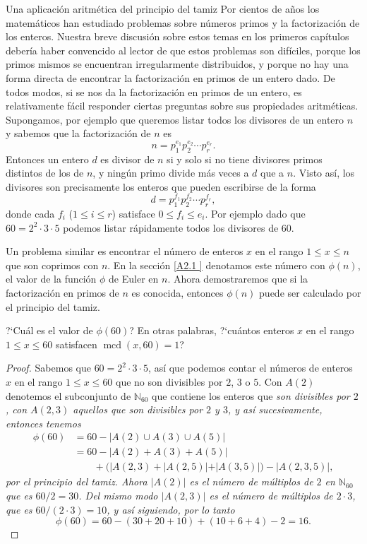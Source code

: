 \begin{section}{Una aplicación aritmética del principio del
tamiz}\label{Ap2.2} Por cientos de años los matemáticos han
estudiado problemas sobre números primos y la fac\-to\-ri\-za\-ción de los
enteros. Nuestra breve discusión sobre estos temas en los primeros
capítulos debería haber convencido al lector de que estos
problemas son difíciles, porque los primos mismos se encuentran
irregularmente distribuidos, y porque no hay una forma directa de
encontrar la factorización en primos de un entero dado. De todos
modos, si se nos da la factorización en primos de un entero, es
relativamente fácil responder ciertas preguntas sobre sus
propiedades aritméticas. Supongamos, por ejemplo que queremos
listar todos los divisores de un entero $n$ y sabemos que la
factorización de $n$ es
$$
n=p_1^{e_1}p_2^{e_2}\cdots p_r^{e_r}.
$$
Entonces un entero $d$ es divisor de $n$ si y solo si no tiene
divisores primos distintos de los de $n$, y ningún primo divide
más veces a $d$ que a $n$. Visto así, los divisores son
precisamente los enteros que pueden escribirse de la forma
$$
d=p_1^{f_1}p_2^{f_2}\cdots p_r^{f_r},
$$
donde cada $f_i$ ($1\le i \le r$) satisface $0\le f_i \le e_i$.
Por ejemplo dado que $60= 2^2 \cdot 3 \cdot 5$ podemos listar
rápidamente todos los divisores de 60.


Un problema similar es encontrar el número de enteros $x$ en el
rango $1 \le x \le n$ que son coprimos con $n$. En la sección
\ref{A2.1 } denotamos este número con $\phi(n)$, el valor de la
función $\phi$ de Euler en $n$. Ahora demostraremos que si la
factorización en primos de $n$ es conocida, entonces $\phi(n)$
puede ser calculado por el principio del tamiz.

\begin{ejemplo}?`Cuál es el valor de $\phi(60)$? En otras
palabras, ?`cuántos enteros $x$ en el rango $1 \le x \le 60$
satisfacen $\operatorname{mcd}(x,60)=1$?
\end{ejemplo}
\begin{proof} Sabemos que $60 =2^2 \cdot 3 \cdot 5$, así que
podemos contar el números de enteros $x$ en el rango $1 \le x \le
60$ que no son divisibles por $2$, $3$ o $5$. Con $A(2)$ denotemos el
subconjunto de $\mathbb N_{60}$ que contiene los enteros que \it
son \rm divisibles por $2$, con $A(2,3)$ aquellos que \it son \rm
divisibles por $2$ y $3$, y así sucesivamente, entonces tenemos
$$\begin{aligned}
\phi(60)&=60-|A(2) \cup A(3) \cup A(5)| \\
&= 60-|A(2) + A(3) + A(5)| \\
&\qquad+(|A(2,3) + |A(2,5)| + |A(3,5)|)-|A(2,3,5)|,
\end{aligned}
$$
por el principio del tamiz. Ahora $|A(2)|$ es el número de
múltiplos de $2$ en $\mathbb N_{60}$ que es $60 /2 = 30$. Del mismo
modo $|A(2,3)|$ es el número de múltiplos de $2 \cdot 3$, que es
$60 /(2\cdot 3) = 10$, y así siguiendo, por lo tanto
$$
\phi(60) = 60 -(30+20+10)+(10+6+4)-2=16.
$$
\end{proof}


\end{section}
